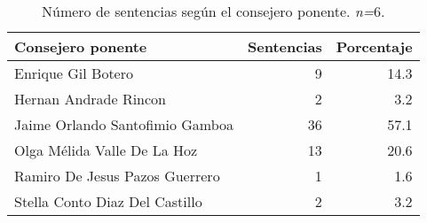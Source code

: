 \begin{table}[!htbp]
\centering
\caption{Número de sentencias según el consejero ponente. \textit{n=}6.} 
\label{tab:consejero}
\begin{tabular}{lrr}
  \hline
Consejero ponente & Sentencias & Porcentaje \\ 
  \hline
Enrique Gil Botero &  9 & 14.3 \\ 
  Hernan Andrade Rincon &  2 & 3.2 \\ 
  Jaime Orlando Santofimio Gamboa & 36 & 57.1 \\ 
  Olga Mélida Valle De La Hoz & 13 & 20.6 \\ 
  Ramiro De Jesus Pazos Guerrero &  1 & 1.6 \\ 
  Stella Conto Diaz Del Castillo &  2 & 3.2 \\ 
   \hline
\end{tabular}
\end{table}
